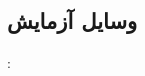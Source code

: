 



\subsection*{\Large وسایل آزمایش}
\vspace{5mm}
\begin{enumerate}
    {\item \textbf{\eqName}: \textcolor{black!70}{\eqRole}}
\end{enumerate}
